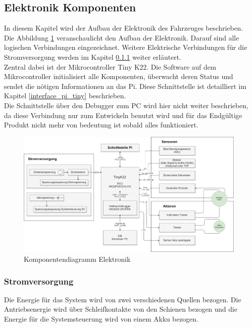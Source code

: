 \documentclass[../../main.tex]{subfiles}
\begin{document}
    \subsection{Elektronik Komponenten}
    In diesem Kapitel wird der Aufbau der Elektronik des Fahrzeuges beschrieben. \\
    Die Abbildung \ref{fig:et_komponenten} veranschaulicht den Aufbau der Elektronik. Darauf sind alle logischen Verbindungen eingezeichnet. Weitere Elektrische Verbindungen für die Stromversorgung werden im Kapitel \ref{et_stromversorgung} weiter erläutert.\\
     Zentral dabei ist der Mikrocontroller Tiny K22. Die Software auf dem Mikrocontroller initialisiert alle Komponenten, überwacht deren Status und sendet die nötigen Informationen an  das Pi. Diese Schnittstelle ist detailliert im Kapitel \ref{interface_pi_tiny} beschrieben.\\
    Die Schnittstelle über den Debugger zum PC wird hier nicht weiter beschrieben, da diese Verbindung nur zum Entwickeln benutzt wird und für das Endgültige Produkt nicht mehr von bedeutung ist sobald alles funktioniert.

    \begin{figure}[H]
        \centering
        \includegraphics[width=1.0\textwidth]{../../drawings/KomponentenDiagramm/KomponentenDiagramm_ET.png}
        \caption {Komponentendiagramm Elektronik}
        \label{fig:et_komponenten}
    \end{figure}

    \subsubsection{Stromversorgung} \label{et_stromversorgung}
    Die Energie für das System wird von zwei verschiedenen Quellen bezogen. Die Antriebsenergie wird über Schleifkontakte von den Schienen bezogen und die Energie für die Systemsteuerung wird von einem Akku bezogen.\\
\end{document}
